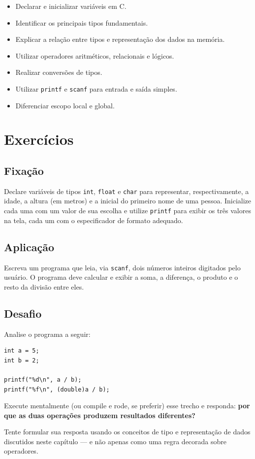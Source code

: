 \begin{objetivos}
\begin{itemize}
    \item Declarar e inicializar variáveis em C.
    \item Identificar os principais tipos fundamentais.
    \item Explicar a relação entre tipos e representação dos dados na memória.
    \item Utilizar operadores aritméticos, relacionais e lógicos.
    \item Realizar conversões de tipos.
    \item Utilizar \texttt{printf} e \texttt{scanf} para entrada e saída simples.
    \item Diferenciar escopo local e global.
\end{itemize}
\end{objetivos}

\section*{Exercícios}

\begin{exercicio}

\subsection*{Fixação}
Declare variáveis de tipos \texttt{int}, \texttt{float} e \texttt{char} para representar, respectivamente, a idade, a altura (em metros) e a inicial do primeiro nome de uma pessoa. Inicialize cada uma com um valor de sua escolha e utilize \texttt{printf} para exibir os três valores na tela, cada um com o especificador de formato adequado.


\subsection*{Aplicação}
Escreva um programa que leia, via \texttt{scanf}, dois números inteiros digitados pelo usuário. O programa deve calcular e exibir a soma, a diferença, o produto e o resto da divisão entre eles.


\subsection*{Desafio}
Analise o programa a seguir:

\begin{lstlisting}
int a = 5;
int b = 2;

printf("%d\n", a / b);
printf("%f\n", (double)a / b);
\end{lstlisting}

Execute mentalmente (ou compile e rode, se preferir) esse trecho e responda: \textbf{por que as duas operações produzem resultados diferentes?}

Tente formular sua resposta usando os conceitos de tipo e representação de dados discutidos neste capítulo — e não apenas como uma regra decorada sobre operadores.


\end{exercicio}



